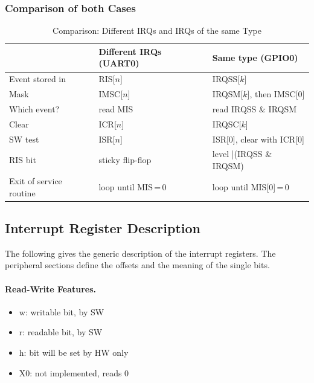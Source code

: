 \subsubsection{Comparison of both Cases}

\begin{table}[H]
\caption{Comparison: Different IRQs and IRQs of the same Type}
\label{tab:archirq03}
\centering
\begin{tabularx}{\textwidth}{|l|X|X|}
  \hline
   & Different IRQs (UART0) & Same type (GPIO0) \\
  \hline
  \hline
  Event stored in & RIS[$n$] & IRQSS[$k$] \\
  \hline
  Mask & IMSC[$n$] & IRQSM[$k$], then IMSC[0] \\
  \hline
  Which event? & read MIS & read IRQSS \& IRQSM \\
  \hline
  Clear & ICR[$n$] & IRQSC[$k$] \\
  \hline
  SW test & ISR[$n$] & ISR[0], clear with ICR[0] \\
  \hline
  RIS bit & sticky flip-flop & level |(IRQSS \& IRQSM) \\
  \hline
  Exit of service routine & loop until MIS\,=\,0 & loop until MIS[0]\,=\,0 \\
  \hline
\end{tabularx}
\end{table}

\subsection{Interrupt Register Description}
\label{subsec:archirqregs}

The following gives the generic description of the interrupt registers. The
peripheral sections define the offsets and the meaning of the single bits.

\paragraph{Read-Write Features.}
\begin{itemize}
  \item w: writable bit, by SW
  \item r: readable bit, by SW
  \item h: bit will be set by HW only
  \item X0: not implemented, reads 0
\end{itemize}

